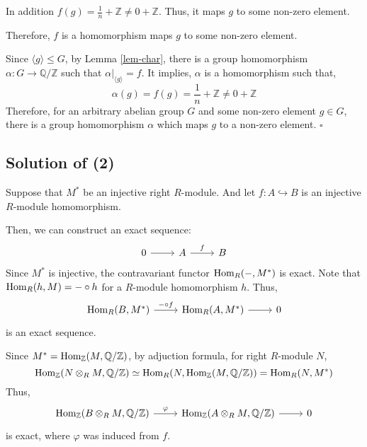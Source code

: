 \documentclass{article}
\newcommand{\qedsq}{\hfill$\square$}
\newcommand{\bbQ}{\mathbb{Q}}
\newcommand{\bbZ}{\mathbb{Z}}
\newcommand{\Hom}{\textnormal{Hom}}
\begin{document}
In addition \(f(g) = \frac{1}{n} + \bbZ \neq 0 + \bbZ\). Thus, it maps \(g\) to some non-zero element.

Therefore, \(f\) is a homomorphism maps \(g\) to some non-zero element.
\newline

Since \(\langle g \rangle \le G\), by Lemma \ref{lem-char},
there is a group homomorphism \(\alpha: G \to \bbQ / \bbZ\)
such that \(\left. \alpha \right|_{\langle g \rangle} = f\).
It implies, \(\alpha\) is a homomorphism such that,
\[\alpha(g) = f(g) = \frac{1}{n} + \bbZ \neq 0 + \bbZ\]
Therefore, for an arbitrary abelian group \(G\) and some non-zero element \(g \in G\), there is a group homomorphism \(\alpha\) which maps \(g\) to a non-zero element.
\qedsq

\subsection*{Solution of (2)}

Suppose that \(M^*\) be an injective right \(R\)-module.
And let \(f: A \hookrightarrow B\) is an injective \(R\)-module homomorphism.

Then, we can construct an exact sequence:
\[\begin{tikzcd}
  0 \ar{r} &
  A \ar["f"]{r} &
  B
\end{tikzcd}\]
Since \(M^*\) is injective, the contravariant functor \(\Hom_R(-, M^*)\) is exact.
Note that \(\Hom_R(h, M) = - \circ h\) for a \(R\)-module homomorphism \(h\).
Thus,
\[\begin{tikzcd}
  \Hom_R(B, M^*) \ar["- \circ f"]{r} &
  \Hom_R(A, M^*) \ar{r} &
  0
\end{tikzcd}\]
is an exact sequence.

Since \(M^* = \Hom_\bbZ(M, \bbQ/\bbZ)\),
by adjuction formula,
for right \(R\)-module \(N\),
\[\Hom_\bbZ(N \otimes_R M, \bbQ/\bbZ)
  \simeq \Hom_R(N, \Hom_\bbZ(M, \bbQ/\bbZ))
  = \Hom_R(N, M^*)\]
Thus,
\[\begin{tikzcd}
  \Hom_\bbZ(B \otimes_R M, \bbQ/\bbZ) \ar["\varphi"]{r} &
  \Hom_\bbZ(A \otimes_R M, \bbQ/\bbZ) \ar{r} &
  0
\end{tikzcd}\]
is exact, where \(\varphi\) was induced from \(f\).
\end{document}
